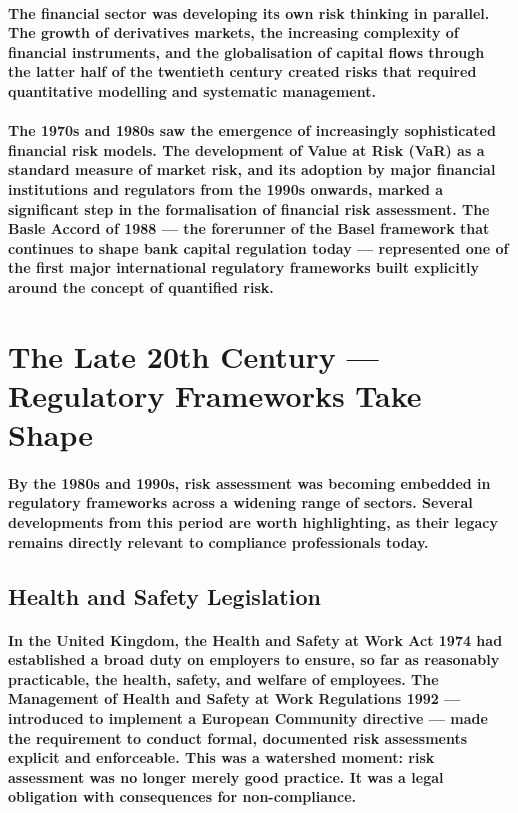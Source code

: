 \paragraph{The financial sector was developing its own risk thinking in parallel. The growth of derivatives markets, the increasing complexity of financial instruments, and the globalisation of capital flows through the latter half of the twentieth century created risks that required quantitative modelling and systematic management.}
\paragraph{The 1970s and 1980s saw the emergence of increasingly sophisticated financial risk models. The development of \textbf{Value at Risk (VaR)} as a standard measure of market risk, and its adoption by major financial institutions and regulators from the 1990s onwards, marked a significant step in the formalisation of financial risk assessment. The Basle Accord of 1988 — the forerunner of the Basel framework that continues to shape bank capital regulation today — represented one of the first major international regulatory frameworks built explicitly around the concept of quantified risk.}

\section{The Late 20th Century — Regulatory Frameworks Take Shape}
\paragraph{By the 1980s and 1990s, risk assessment was becoming embedded in regulatory frameworks across a widening range of sectors. Several developments from this period are worth highlighting, as their legacy remains directly relevant to compliance professionals today.}

\subsection{Health and Safety Legislation}

\paragraph{In the United Kingdom, the \textbf{Health and Safety at Work Act 1974} had established a broad duty on employers to ensure, so far as reasonably practicable, the health, safety, and welfare of employees. The \textbf{Management of Health and Safety at Work Regulations 1992} — introduced to implement a European Community directive — made the requirement to conduct formal, documented risk assessments explicit and enforceable. This was a watershed moment: risk assessment was no longer merely good practice. It was a legal obligation with consequences for non-compliance.}

